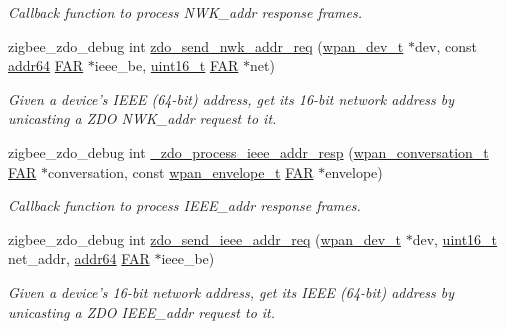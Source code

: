 \begin{DoxyCompactItemize}
\begin{DoxyCompactList}\small\item\em Callback function to process N\-W\-K\-\_\-addr response frames. \end{DoxyCompactList}\item 
zigbee\-\_\-zdo\-\_\-debug int \hyperlink{group__zdo_ga40f076c190ab2390836687b8e1f705eb}{zdo\-\_\-send\-\_\-nwk\-\_\-addr\-\_\-req} (\hyperlink{structwpan__dev__t}{wpan\-\_\-dev\-\_\-t} $\ast$dev, const \hyperlink{unionaddr64}{addr64} \hyperlink{group__hal_gaef060b3456fdcc093a7210a762d5f2ed}{F\-A\-R} $\ast$ieee\-\_\-be, \hyperlink{group__hal_ga5a8b2dc9e45a9ee81a94ef304fb62505}{uint16\-\_\-t} \hyperlink{group__hal_gaef060b3456fdcc093a7210a762d5f2ed}{F\-A\-R} $\ast$net)
\begin{DoxyCompactList}\small\item\em Given a device's I\-E\-E\-E (64-\/bit) address, get its 16-\/bit network address by unicasting a Z\-D\-O N\-W\-K\-\_\-addr request to it. \end{DoxyCompactList}\item 
zigbee\-\_\-zdo\-\_\-debug int \hyperlink{group__zdo_gad723bd899ccda9ec96f6226893c1335b}{\-\_\-zdo\-\_\-process\-\_\-ieee\-\_\-addr\-\_\-resp} (\hyperlink{structwpan__conversation__t}{wpan\-\_\-conversation\-\_\-t} \hyperlink{group__hal_gaef060b3456fdcc093a7210a762d5f2ed}{F\-A\-R} $\ast$conversation, const \hyperlink{structwpan__envelope__t}{wpan\-\_\-envelope\-\_\-t} \hyperlink{group__hal_gaef060b3456fdcc093a7210a762d5f2ed}{F\-A\-R} $\ast$envelope)
\begin{DoxyCompactList}\small\item\em Callback function to process I\-E\-E\-E\-\_\-addr response frames. \end{DoxyCompactList}\item 
zigbee\-\_\-zdo\-\_\-debug int \hyperlink{group__zdo_ga4af5f8d70054f7883dbc1305e3a3f181}{zdo\-\_\-send\-\_\-ieee\-\_\-addr\-\_\-req} (\hyperlink{structwpan__dev__t}{wpan\-\_\-dev\-\_\-t} $\ast$dev, \hyperlink{group__hal_ga5a8b2dc9e45a9ee81a94ef304fb62505}{uint16\-\_\-t} net\-\_\-addr, \hyperlink{unionaddr64}{addr64} \hyperlink{group__hal_gaef060b3456fdcc093a7210a762d5f2ed}{F\-A\-R} $\ast$ieee\-\_\-be)
\begin{DoxyCompactList}\small\item\em Given a device's 16-\/bit network address, get its I\-E\-E\-E (64-\/bit) address by unicasting a Z\-D\-O I\-E\-E\-E\-\_\-addr request to it. \end{DoxyCompactList}\end{DoxyCompactItemize}
